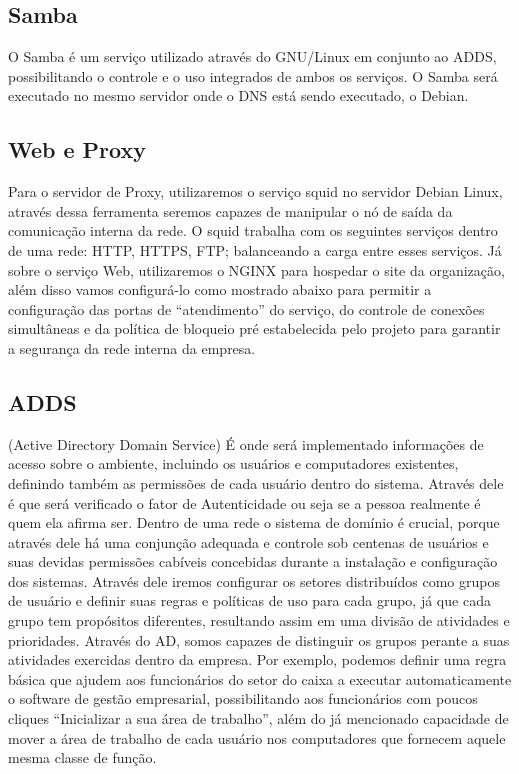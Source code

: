 \documentclass[12pt]{article}
\begin{document}
\subsection{Samba}
O Samba é um serviço utilizado através do GNU/Linux em conjunto ao ADDS, possibilitando o controle e o uso integrados de ambos os serviços. O Samba será executado no mesmo servidor onde o DNS está sendo executado, o Debian.
\subsection{Web e Proxy}
Para o servidor de Proxy, utilizaremos o serviço squid no servidor Debian Linux, através dessa ferramenta seremos capazes de manipular o nó de saída da comunicação interna da rede. O squid trabalha com os seguintes serviços dentro de uma rede: HTTP, HTTPS, FTP; balanceando a carga entre esses serviços. Já sobre o serviço Web, utilizaremos o NGINX para hospedar o site da organização, além disso vamos configurá-lo como mostrado abaixo para permitir a configuração das portas de “atendimento” do serviço, do controle de conexões simultâneas e da política de bloqueio pré estabelecida pelo projeto para garantir a segurança da rede interna da empresa.
\subsection{ADDS}
(Active Directory Domain Service) É onde será implementado informações de acesso sobre o ambiente, incluindo os usuários e computadores existentes, definindo também as permissões de cada usuário dentro do sistema. Através dele é que será verificado o fator de Autenticidade ou seja se a pessoa realmente é quem ela afirma ser.
Dentro de uma rede o sistema de domínio é crucial, porque através dele há uma conjunção adequada e controle sob centenas de usuários e suas devidas permissões cabíveis concebidas durante a instalação e configuração dos sistemas. Através dele iremos configurar os setores distribuídos como grupos de usuário e definir suas regras e políticas de uso para cada grupo, já que cada grupo tem propósitos diferentes, resultando assim em uma divisão de atividades e prioridades.
Através do AD, somos capazes de distinguir os grupos perante a suas atividades exercidas dentro da empresa. Por exemplo, podemos definir uma regra básica que ajudem aos funcionários do setor do caixa a executar automaticamente o software de gestão empresarial, possibilitando aos funcionários com poucos cliques “Inicializar a sua área de trabalho”, além do já mencionado capacidade de  mover a área de trabalho de cada usuário nos computadores que fornecem aquele mesma classe de função.
\end{document}

